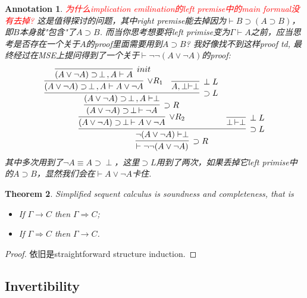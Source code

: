 \documentclass{article}
\theoremstyle{plain}
\newtheorem{theorem}{Theorem}
\newtheorem{annotation}[theorem]{Annotation}
\theoremstyle{nonumberplain}
\newtheorem{proof}{Proof}
\newcommand{\redt}[1]{\textcolor{red}{#1}}
\begin{document}
\begin{annotation}
\rm \redt{为什么implication emilination的left premise中的main formual没有去掉?} 这是值得探讨的问题，其中right premise能去掉因为$\vdash B \supset (A \supset B)$，即$B$本身就"包含"了$A \supset B$. 而当你思考想要将left primise变为$\Gamma \vdash A$之前，应当思考是否存在一个关于$A$的proof里面需要用到$A \supset B$? 我好像找不到这样proof td, 最终经过在MSE上提问得到了一个关于$\vdash \neg \neg (A \vee \neg A)$的proof:
\[
	\infer[\supset R]{\vdash \neg \neg (A \vee \neg A)}{\infer[\supset L]{\neg (A \vee \neg A) \vdash \perp}{\infer[\vee R_2]{(A \vee \neg A) \supset \, \perp \, \vdash A \vee \neg A}{\infer[\supset R]{(A \vee \neg A) \supset \, \perp \, \vdash \neg A}{\infer[\supset L]{(A \vee \neg A) \supset \, \perp \, ,A \vdash \perp}{\infer[\vee R_1]{(A \vee \neg A) \supset \, \perp \,,A \vdash A \vee \neg A}{\infer[init]{(A \vee \neg A) \supset \, \perp \,,A \vdash A}{}} & \infer[\perp L]{A, \perp \vdash \perp}{}}}} & \infer[\perp L]{\perp\, \vdash \perp}{} }}
\]
其中多次用到了$\neg A \equiv A \supset \perp$，这里$\supset L$用到了两次，如果丢掉它left primise中的$A \supset B$，显然我们会在$\vdash A \vee \neg A$卡住.  
\end{annotation}

%

\begin{theorem}
\rm Simplified sequent calculus is soundness and completeness, that is
\begin{itemize}
	\item If $\Gamma \to C$ then $\Gamma \Rightarrow C$;
	\item If $\Gamma \Rightarrow C$ then $\Gamma \to C$.
\end{itemize}
\end{theorem}

\begin{proof}
依旧是straightforward structure induction.
\end{proof}



\newpage
\subsection{Invertibility}\label{invertible calculus}	
\end{document}
